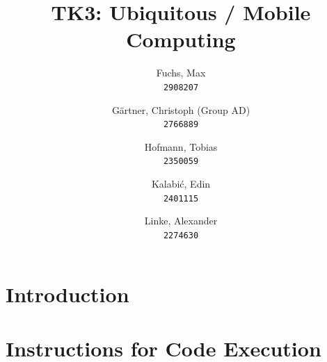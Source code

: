\documentclass{article}
\begin{document}
\author{
  Fuchs, Max\\
  \texttt{2908207}
  \and
  Gärtner, Christoph (Group AD)\\
  \texttt{2766889}
  \and
  Hofmann, Tobias\\
  \texttt{2350059}
  \and
  Kalabić, Edin\\
  \texttt{2401115}
  \and
  Linke, Alexander\\
  \texttt{2274630}
}

\posttitle{\end{center}}

\title{TK3: Ubiquitous / Mobile Computing}



\maketitle



\section{Introduction}



\section{Instructions for Code Execution}
\end{document}
